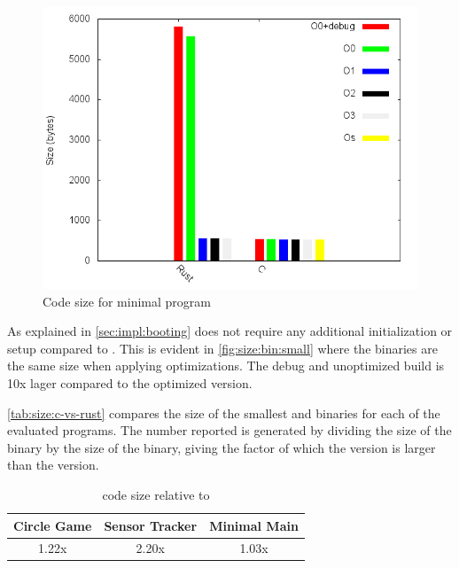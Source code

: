 \begin{figure}[H]
  \begin{center}
    \includegraphics[scale=0.5]{results/plots/size/bin/small/size.png}
  \end{center}
  \caption{Code size for minimal program}
  \label{fig:size:bin:small}
\end{figure}

As explained in \autoref{sec:impl:booting} {\rust} does not require any additional initialization or setup compared to {\C}.
This is evident in \autoref{fig:size:bin:small} where the binaries are the same size when applying optimizations.
The debug and unoptimized {\rust} build is 10x lager compared to the optimized version.

\autoref{tab:size:c-vs-rust} compares the size of the smallest {\C} and {\rust} binaries for each of the evaluated programs.
The number reported is generated by dividing the size of the {\rust} binary by the size of the {\C} binary, giving the factor of which the {\rust} version is larger than the {\C} version.

\begin{table}[H]
  \centering
  \begin{tabular}{|c|c|c|}
    \hline
    Circle Game & Sensor Tracker & Minimal Main \\
    \hline
    1.22x & 2.20x & 1.03x \\
    \hline
  \end{tabular}
  \caption{{\rust} code size relative to {\C}}
  \label{tab:size:c-vs-rust}
\end{table}

